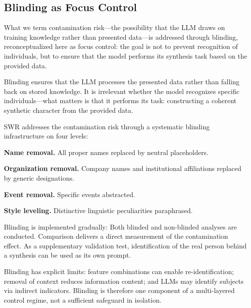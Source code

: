 \documentclass[11pt,a4paper]{article}
\theoremstyle{definition}
\theoremstyle{plain}
\theoremstyle{remark}
\begin{document}
\subsection{Blinding as Focus Control}
\label{sec:blinding}

What we term contamination risk---the possibility that the LLM draws on training knowledge rather than presented data---is addressed through blinding, reconceptualized here as focus control: the goal is not to prevent recognition of individuals, but to ensure that the model performs its synthesis task based on the provided data.

Blinding ensures that the LLM processes the presented data rather than falling back on stored knowledge. It is irrelevant whether the model recognizes specific individuals---what matters is that it performs its task: constructing a coherent synthetic character from the provided data.

SWR addresses the contamination risk through a systematic blinding infrastructure on four levels:

\begin{description}[leftmargin=*,labelwidth=2.5cm]
  \item[Level 1:] \textbf{Name removal.} All proper names replaced by neutral placeholders.
  \item[Level 2:] \textbf{Organization removal.} Company names and institutional affiliations replaced by generic designations.
  \item[Level 3:] \textbf{Event removal.} Specific events abstracted.
  \item[Level 4:] \textbf{Style leveling.} Distinctive linguistic peculiarities paraphrased.
\end{description}

Blinding is implemented gradually: Both blinded and non-blinded analyses are conducted. Comparison delivers a direct measurement of the contamination effect. As a supplementary validation test, identification of the real person behind a synthesis can be used as its own prompt.

Blinding has explicit limits: feature combinations can enable re-identification; removal of context reduces information content; and LLMs may identify subjects via indirect indicators. Blinding is therefore one component of a multi-layered control regime, not a sufficient safeguard in isolation.
\end{document}
